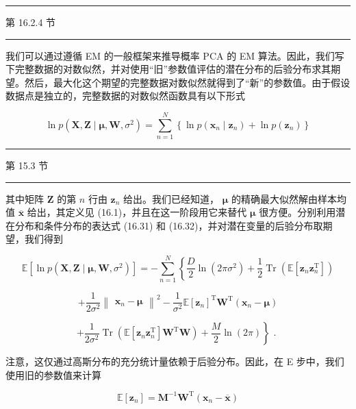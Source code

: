 \documentclass[10pt]{report}
\newcommand{\HRule}{\begin{center}\rule{0.9\linewidth}{0.2mm}\end{center}}
\begin{document}
\HRule

第 16.2.4 节

\HRule

我们可以通过遵循 EM 的一般框架来推导概率 PCA 的 EM 算法。因此，我们写下完整数据的对数似然，并对使用“旧”参数值评估的潜在分布的后验分布求其期望。然后，最大化这个期望的完整数据对数似然就得到了“新”的参数值。由于假设数据点是独立的，完整数据的对数似然函数具有以下形式

\[
\ln p\left( {\mathbf{X},\mathbf{Z} \mid  \mathbf{\mu },\mathbf{W},{\sigma }^{2}}\right)  = \mathop{\sum }\limits_{{n = 1}}^{N}\left\{  {\ln p\left( {{\mathbf{x}}_{n} \mid  {\mathbf{z}}_{n}}\right)  + \ln p\left( {\mathbf{z}}_{n}\right) }\right\}   \tag{16.64}
\]

\HRule

第 15.3 节

\HRule

其中矩阵 \(\mathbf{Z}\) 的第 \(n\) 行由 \({\mathbf{z}}_{n}\) 给出。我们已经知道， \(\mathbf{\mu }\) 的精确最大似然解由样本均值 \(\overline{\mathbf{x}}\) 给出，其定义见 (16.1)，并且在这一阶段用它来替代 \(\mathbf{\mu }\) 很方便。分别利用潜在分布和条件分布的表达式 (16.31) 和 (16.32)，并对潜在变量的后验分布取期望，我们得到

\[
\mathbb{E}\left\lbrack  {\ln p\left( {\mathbf{X},\mathbf{Z} \mid  \mathbf{\mu },\mathbf{W},{\sigma }^{2}}\right) }\right\rbrack   =  - \mathop{\sum }\limits_{{n = 1}}^{N}\left\{  {\frac{D}{2}\ln \left( {{2\pi }{\sigma }^{2}}\right)  + \frac{1}{2}\operatorname{Tr}\left( {\mathbb{E}\left\lbrack  {{\mathbf{z}}_{n}{\mathbf{z}}_{n}^{\mathrm{T}}}\right\rbrack  }\right) }\right.
\]

\[
+ \frac{1}{2{\sigma }^{2}}{\begin{Vmatrix}{\mathbf{x}}_{n} - \mathbf{\mu }\end{Vmatrix}}^{2} - \frac{1}{{\sigma }^{2}}\mathbb{E}{\left\lbrack  {\mathbf{z}}_{n}\right\rbrack  }^{\mathrm{T}}{\mathbf{W}}^{\mathrm{T}}\left( {{\mathbf{x}}_{n} - \mathbf{\mu }}\right)
\]

\[
\left. {+\frac{1}{2{\sigma }^{2}}\operatorname{Tr}\left( {\mathbb{E}\left\lbrack  {{\mathbf{z}}_{n}{\mathbf{z}}_{n}^{\mathrm{T}}}\right\rbrack  {\mathbf{W}}^{\mathrm{T}}\mathbf{W}}\right)  + \frac{M}{2}\ln \left( {2\pi }\right) }\right\}  \text{ . } \tag{16.65}
\]

注意，这仅通过高斯分布的充分统计量依赖于后验分布。因此，在 E 步中，我们使用旧的参数值来计算

\[
\mathbb{E}\left\lbrack  {\mathbf{z}}_{n}\right\rbrack   = {\mathbf{M}}^{-1}{\mathbf{W}}^{\mathrm{T}}\left( {{\mathbf{x}}_{n} - \overline{\mathbf{x}}}\right)  \tag{16.66}
\]
\end{document}
